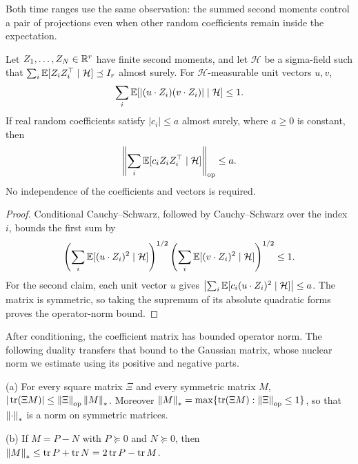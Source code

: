 Both time ranges use the same observation: the summed second moments
control a pair of projections even when other random coefficients
remain inside the expectation.

\begin{fact}\label{tb:covariance}
Let \(Z_1,\ldots,Z_N\in\mathbb R^r\) have finite second moments, and let
\(\mathcal H\) be a sigma-field such that
\(\sum_i\mathbb E[Z_iZ_i^\top\mid\mathcal H]\preceq I_r\) almost surely.
For \(\mathcal H\)-measurable unit vectors \(u,v\),
\[
 \sum_i\mathbb E[|(u\cdot Z_i)(v\cdot Z_i)|\mid\mathcal H]\le1.
\]
If real random coefficients satisfy \(|c_i|\le a\) almost surely,
where \(a\ge0\) is constant, then
\[
 \left\|\sum_i\mathbb E[c_iZ_iZ_i^\top\mid\mathcal H]\right\|_{\mathrm{op}}\le a.
\]
No independence of the coefficients and vectors is required.
\end{fact}

\begin{proof}
Conditional Cauchy--Schwarz, followed by Cauchy--Schwarz over the
index \(i\), bounds the first sum by
\[
 \left(\sum_i\mathbb E[(u\cdot Z_i)^2\mid\mathcal H]\right)^{1/2}
 \left(\sum_i\mathbb E[(v\cdot Z_i)^2\mid\mathcal H]\right)^{1/2}\le1.
\]
For the second claim, each unit vector \(u\) gives
\(\bigl|\sum_i\mathbb E[c_i(u\cdot Z_i)^2\mid\mathcal H]\bigr|\le a\).
The matrix is symmetric, so taking the supremum of its absolute
quadratic forms proves the operator-norm bound.
\end{proof}


After conditioning, the coefficient matrix has bounded operator norm.
The following duality transfers that bound to the Gaussian matrix, whose
nuclear norm we estimate using its positive and negative parts.

\begin{fact}\label{tb:nuclear}
(a) For every square matrix \(\Xi\) and every symmetric matrix \(M\),
\(|\operatorname{tr}(\Xi M)|\le\left\lVert\Xi\right\rVert_{\mathrm{op}}\left\lVert M\right\rVert_*\). Moreover
\(\left\lVert M\right\rVert_*=\max\{\operatorname{tr}(\Xi M):\left\lVert\Xi\right\rVert_{\mathrm{op}}\le1\}\), so that \(\left\lVert\cdot\right\rVert_*\) is
a norm on symmetric matrices.

(b) If \(M=P-N\) with \(P\succeq0\) and \(N\succeq0\), then
\(\left\lVert M\right\rVert_*\le\operatorname{tr} P+\operatorname{tr} N=2\operatorname{tr} P-\operatorname{tr} M\).
\end{fact}

